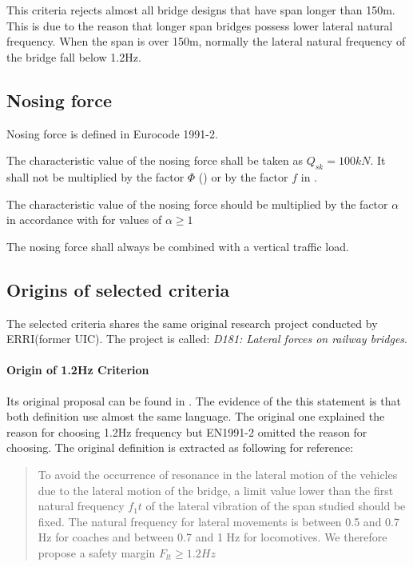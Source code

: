 This criteria rejects almost all bridge designs that have span longer than 150m. This is due to the reason that longer span bridges possess lower lateral natural frequency. When the span is over 150m, normally the lateral natural frequency of the bridge fall below 1.2Hz. 

\subsection{Nosing force}\label{sec:nosingforce}
Nosing force is defined in Eurocode 1991-2. 

The characteristic value of the nosing force shall be taken as $Q_{sk} = 100kN$. It shall not be multiplied by the factor $\Phi$ (\citet[6.45]{EC12}) or by the factor $f$ in \citet[6.51]{EC12}. 

The characteristic value of the nosing force should be multiplied by the factor $\alpha$ in accordance with \citet[6.3.2]{EC12} for values of $\alpha \geq 1$

The nosing force shall always be combined with a vertical traffic load.


\subsection{Origins of selected criteria}
The selected criteria shares the same original research project conducted by ERRI(former UIC). The project is called: \textit{D181: Lateral forces on railway bridges}. 

\paragraph{Origin of 1.2Hz Criterion}
Its original proposal can be found in \citet[Proposed criteria]{d181}. The evidence of the this statement is that both definition use almost the same language. The original one explained the reason for choosing 1.2Hz frequency but EN1991-2 omitted the reason for choosing. The original definition is extracted as following for reference:

\begin{quote}
	To avoid the occurrence of resonance in the lateral motion of the vehicles due to the lateral motion of the bridge, a limit value lower than the first natural frequency $f_1t$ of the lateral vibration of the span studied should be fixed. The natural frequency for lateral movements is between 0.5 and 0.7 Hz for coaches and between 0.7 and 1 Hz for locomotives. We therefore propose a safety margin $F_{lt} \geq 1.2Hz$
\end{quote}

